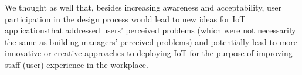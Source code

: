 We thought as well that, besides increasing awareness and acceptability, user participation in the design process would lead to new ideas for IoT applicationsthat addressed users’ perceived problems (which were not necessarily the same as building managers’ perceived problems) and potentially lead to more innovative or creative approaches to deploying IoT for the purpose of improving staff (user) experience in the workplace. 

